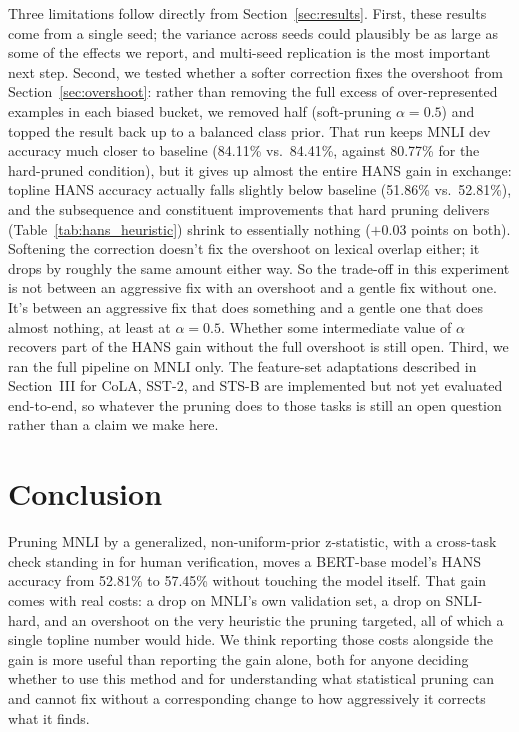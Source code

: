 \documentclass[conference]{IEEEtran}
\begin{document}
Three limitations follow directly from Section~\ref{sec:results}. First, these results come from a single seed; the variance across seeds could plausibly be as large as some of the effects we report, and multi-seed replication is the most important next step. Second, we tested whether a softer correction fixes the overshoot from Section~\ref{sec:overshoot}: rather than removing the full excess of over-represented examples in each biased bucket, we removed half (soft-pruning $\alpha = 0.5$) and topped the result back up to a balanced class prior. That run keeps MNLI dev accuracy much closer to baseline (84.11\% vs.\ 84.41\%, against 80.77\% for the hard-pruned condition), but it gives up almost the entire HANS gain in exchange: topline HANS accuracy actually falls slightly below baseline (51.86\% vs.\ 52.81\%), and the subsequence and constituent improvements that hard pruning delivers (Table~\ref{tab:hans_heuristic}) shrink to essentially nothing ($+0.03$ points on both). Softening the correction doesn't fix the overshoot on lexical overlap either; it drops by roughly the same amount either way. So the trade-off in this experiment is not between an aggressive fix with an overshoot and a gentle fix without one. It's between an aggressive fix that does something and a gentle one that does almost nothing, at least at $\alpha = 0.5$. Whether some intermediate value of $\alpha$ recovers part of the HANS gain without the full overshoot is still open. Third, we ran the full pipeline on MNLI only. The feature-set adaptations described in Section~III for CoLA, SST-2, and STS-B are implemented but not yet evaluated end-to-end, so whatever the pruning does to those tasks is still an open question rather than a claim we make here.

\section{Conclusion}

Pruning MNLI by a generalized, non-uniform-prior z-statistic, with a cross-task check standing in for human verification, moves a BERT-base model's HANS accuracy from 52.81\% to 57.45\% without touching the model itself. That gain comes with real costs: a drop on MNLI's own validation set, a drop on SNLI-hard, and an overshoot on the very heuristic the pruning targeted, all of which a single topline number would hide. We think reporting those costs alongside the gain is more useful than reporting the gain alone, both for anyone deciding whether to use this method and for understanding what statistical pruning can and cannot fix without a corresponding change to how aggressively it corrects what it finds.



\end{document}
